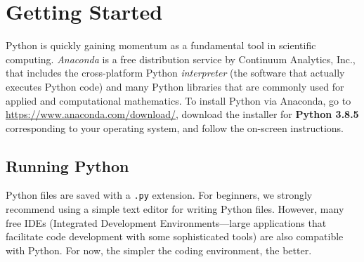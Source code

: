 \label{lab:Python_Intro}

\section*{Getting Started} %

Python is quickly gaining momentum as a fundamental tool in scientific computing.
\emph{Anaconda} is a free distribution service by Continuum Analytics, Inc., that includes the cross-platform Python \emph{interpreter} (the software that actually executes Python code) and many Python libraries that are commonly used for applied and computational mathematics.
To install Python via Anaconda, go to \url{https://www.anaconda.com/download/}, download the installer for \textbf{Python 3.8.5} corresponding to your operating system, and follow the on-screen instructions.

\subsection*{Running Python} %

Python files are saved with a \texttt{.py} extension.
For beginners, we strongly recommend using a simple text editor for writing Python files.
However, many free IDEs (Integrated Development Environments---large applications that facilitate code development with some sophisticated tools) are also compatible with Python.
For now, the simpler the coding environment, the better.

